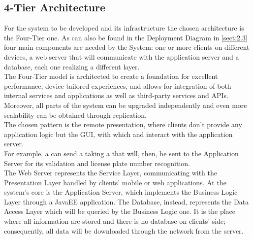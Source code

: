 \documentclass[../../../DD.tex]{subfiles}
\begin{document}
	
	\subsection*{4-Tier Architecture\label{subsect:2.6.1}}
	For the system to be developed and its infrastructure the chosen architecture is the Four-Tier one. As can also be found in the Deployment Diagram in \ref{sect:2.3} four main components are needed by the System: one or more clients on different devices, a web server that will communicate with the application server and a database, each one realizing a different layer. \\
	The Four‑Tier model is architected to create a foundation for excellent performance, device‑tailored experiences, and allows for integration of both internal services and applications as well as third‑party services and APIs. Moreover, all parts of the system can be upgraded independently and even more scalability can be obtained through replication. \\
	
	The chosen pattern is the remote presentation, where clients don't provide any application logic but the GUI, with which  and  interact with the application server. \\
	For example, a  can send a  taking a  that will, then, be sent to the Application Server for its validation and license plate number recognition. \\
	
	The Web Server represents the Service Layer, communicating with the Presentation Layer handled by clients' mobile or web applications. At the system's core is the Application Server, which implements the Business Logic Layer through a JavaEE application. The Database, instead, represents the Data Access Layer which will be queried by the Business Logic one. It is the place where all information are stored and there is no database on clients' side; consequently, all data will be downloaded through the network from the server.
	
\end{document}
